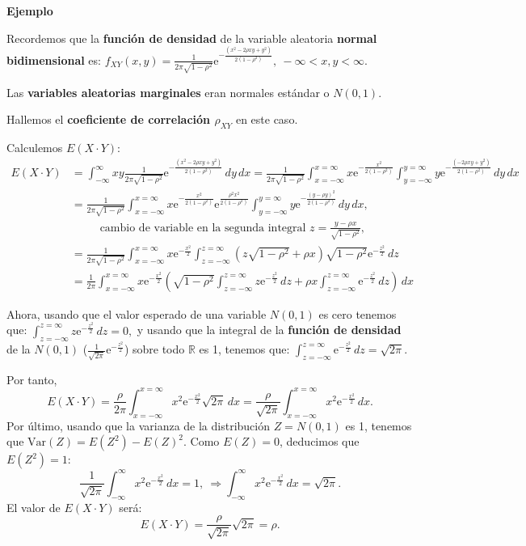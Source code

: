 \documentclass[]{book}
\begin{document}
\textbf{Ejemplo}

Recordemos que la \textbf{función de densidad} de la variable aleatoria \textbf{normal bidimensional} es:
\(f_{XY}(x,y)=\frac{1}{2\pi\sqrt{1-\rho^2}}\mathrm{e}^{-\frac{(x^2-2\rho xy+y^2)}{2(1-\rho^2)}},\ -\infty <x,y<\infty.\)

Las \textbf{variables aleatorias marginales} eran normales estándar o \(N(0,1)\).

Hallemos el \textbf{coeficiente de correlación \(\rho_{XY}\)} en este caso.

Calculemos \(E(X\cdot Y)\):
\[
\begin{array}{rl}
E(X\cdot Y) & = \int_{-\infty}^\infty x y \frac{1}{2\pi\sqrt{1-\rho^2}}\mathrm{e}^{-\frac{(x^2-2\rho xy+y^2)}{2(1-\rho^2)}}\, dy\, dx = \frac{1}{2\pi\sqrt{1-\rho^2}}\int_{x=-\infty}^{x=\infty}x  \mathrm{e}^{-\frac{x^2}{2(1-\rho^2)}}\int_{y=-\infty}^{y=\infty}y \mathrm{e}^{-\frac{(-2\rho xy+y^2)}{2(1-\rho^2)}}\, dy\, dx \\ & = \frac{1}{2\pi\sqrt{1-\rho^2}}\int_{x=-\infty}^{x=\infty}x  \mathrm{e}^{-\frac{x^2}{2(1-\rho^2)}}  \mathrm{e}^{\frac{\rho^2 x^2}{2(1-\rho^2)}} \int_{y=-\infty}^{y=\infty}y \mathrm{e}^{-\frac{(y-\rho y)^2}{2(1-\rho^2)}}\, dy\, dx,\\ &\ \qquad\mbox{ cambio de variable en la segunda integral $z=\frac{y-\rho x}{\sqrt{1-\rho^2}}$,}\\ & = \frac{1}{2\pi\sqrt{1-\rho^2}}\int_{x=-\infty}^{x=\infty}x  \mathrm{e}^{-\frac{x^2}{2}}  \int_{z=-\infty}^{z=\infty} \left(z\sqrt{1-\rho^2}+\rho x\right)\sqrt{1-\rho^2}\mathrm{e}^{-\frac{z^2}{2}}\, dz\, \\ & =
\frac{1}{2\pi} \int_{x=-\infty}^{x=\infty}x  \mathrm{e}^{-\frac{x^2}{2}} \left(\sqrt{1-\rho^2}\int_{z=-\infty}^{z=\infty} z \mathrm{e}^{-\frac{z^2}{2}}\, dz +\rho x \int_{z=-\infty}^{z=\infty}\mathrm{e}^{-\frac{z^2}{2}}\, dz \right)\, dx
\end{array}
\]

Ahora, usando que el valor esperado de una variable \(N(0,1)\) es cero tenemos que:
\(\int_{z=-\infty}^{z=\infty} z \mathrm{e}^{-\frac{z^2}{2}}\, dz =0,\) y usando que la integral de la \textbf{función de densidad} de la \(N(0,1)\) (\(\frac{1}{\sqrt{2\pi}}\mathrm{e}^{-\frac{z^2}{2}}\)) sobre todo \(\mathbb{R}\) es 1, tenemos que:
\(\int_{z=-\infty}^{z=\infty} \mathrm{e}^{-\frac{z^2}{2}}\, dz =\sqrt{2\pi}.\)

Por tanto,
\[
E(X\cdot Y)=\frac{\rho}{2\pi} \int_{x=-\infty}^{x=\infty} x^2  \mathrm{e}^{-\frac{x^2}{2}}\sqrt{2\pi}\, dx=\frac{\rho}{\sqrt{2\pi}}\int_{x=-\infty}^{x=\infty} x^2  \mathrm{e}^{-\frac{x^2}{2}}\, dx.
\]
Por último, usando que la varianza de la distribución \(Z=N(0,1)\) es 1, tenemos que \(\mathrm{Var}(Z)=E\left(Z^2\right)-E(Z)^2\). Como \(E(Z)=0\), deducimos que \(E\left(Z^2\right)=1\):
\[
\frac{1}{\sqrt{2\pi}}\int_{-\infty}^\infty x^2\mathrm{e}^{-\frac{x^2}{2}}\, dx=1,\ \Rightarrow \int_{-\infty}^\infty x^2\mathrm{e}^{-\frac{x^2}{2}}\, dx=\sqrt{2\pi}.
\]
El valor de \(E(X\cdot Y)\) será:
\[
E(X\cdot Y)=\frac{\rho}{\sqrt{2\pi}}\sqrt{2\pi}=\rho.
\]
\end{document}
